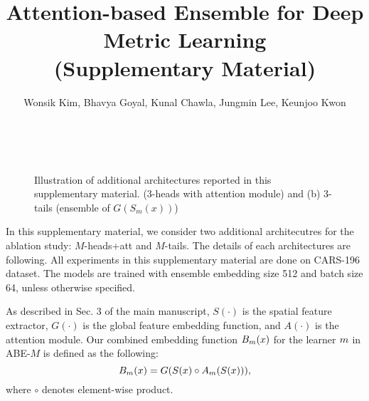 \documentclass[runningheads]{llncs}
\begin{document}




\clearpage
\appendix
\setcounter{secnumdepth}{0}


\title{ \large{Attention-based Ensemble for Deep Metric Learning}\\ \large{(Supplementary Material)}}



\author{Wonsik Kim, Bhavya Goyal, Kunal Chawla, Jungmin Lee, Keunjoo Kwon}


\maketitle

\vspace{-7mm}
\begin{figure}[h]
\begin{center}
    \mbox{
\hspace{3mm}
    }
\end{center}
\vspace{-7mm}
\caption{Illustration of additional architectures reported in this supplementary material.  ($3$-heads with attention module) and (b) $3$-tails (ensemble of $G(S_m(x))$)
}
\label{fig:m_heads_and_m_way}
\end{figure}

\noindent
In this supplementary material, we consider two additional architecutres for the ablation study: $M$-heads+att and $M$-tails. The details of each architectures are following. All experiments in this supplementary material are done on CARS-196 dataset. The models are trained with ensemble embedding size 512 and batch size 64, unless otherwise specified.

As described in Sec. 3 of the main manuscript, $S(\cdot)$ is the spatial feature extractor, $G(\cdot)$ is the global feature embedding function, and $A(\cdot)$ is the attention module.
Our combined embedding function $B_m(x)$ for the learner $m$ in ABE-$M$ is defined as the following:
\begin{equation}
	B_m(x) = G(S(x) \circ A_m(S(x)) ),
\label{eq:embedding}
\end{equation}
where $\circ$ denotes element-wise product.
\end{document}
